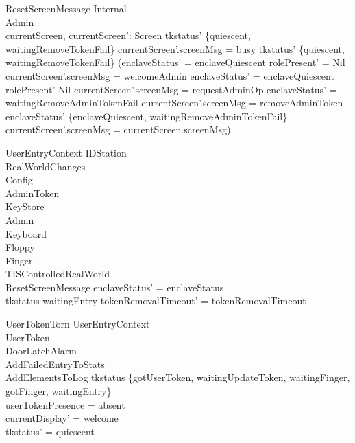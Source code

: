\begin{schema}{ResetScreenMessage}
  \Delta Internal\\
  \Delta Admin\\
  currentScreen, currentScreen': Screen
\where
  tkstatus' \notin  \{quiescent, waitingRemoveTokenFail\} \land  currentScreen'.screenMsg = busy \lor  tkstatus' \in  \{quiescent, waitingRemoveTokenFail\} \land  (enclaveStatus' = enclaveQuiescent \land  rolePresent' = Nil \land  currentScreen'.screenMsg = welcomeAdmin \lor  enclaveStatus' = enclaveQuiescent \land  rolePresent' \neq  Nil \land  currentScreen'.screenMsg = requestAdminOp \lor  enclaveStatus' = waitingRemoveAdminTokenFail \land  currentScreen'.screenMsg = removeAdminToken \lor  enclaveStatus' \notin  \{enclaveQuiescent, waitingRemoveAdminTokenFail\} \land  currentScreen'.screenMsg = currentScreen.screenMsg)
\end{schema}

\begin{schema}{UserEntryContext}
  \Delta IDStation\\
  RealWorldChanges\\
  \Xi Config\\
  \Xi AdminToken\\
  \Xi KeyStore\\
  \Xi Admin\\
  \Xi Keyboard\\
  \Xi Floppy\\
  \Xi Finger\\
  \Xi TISControlledRealWorld\\
  ResetScreenMessage
\where
  enclaveStatus' = enclaveStatus\\
  tkstatus \neq  waitingEntry \implies  tokenRemovalTimeout' = tokenRemovalTimeout
\end{schema}

\begin{schema}{UserTokenTorn}
  UserEntryContext\\
  \Xi UserToken\\
  \Xi DoorLatchAlarm\\
  AddFailedEntryToStats\\
  AddElementsToLog
\where
  tkstatus \in  \{gotUserToken, waitingUpdateToken, waitingFinger, gotFinger, waitingEntry\}\\
  userTokenPresence = absent\\
  currentDisplay' = welcome\\
  tkstatus' = quiescent
\end{schema}

